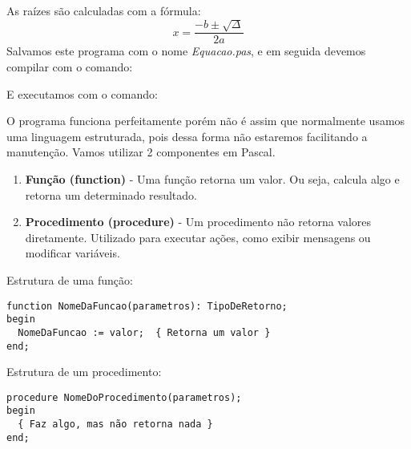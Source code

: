 As raízes são calculadas com a fórmula:
\[
  x = \frac{-b \pm \sqrt{\Delta}}{2a}
\]
Salvamos este programa com o nome \textit{Equacao.pas}, e em seguida devemos compilar com o comando: \\

E executamos com o comando: \\

O programa funciona perfeitamente porém não é assim que normalmente usamos uma linguagem estruturada, pois dessa forma não estaremos facilitando a manutenção. Vamos utilizar 2 componentes em Pascal. \vspace{-2em}
\begin{enumerate}
	\item \textbf{Função (function)} - Uma função retorna um valor. Ou seja, calcula algo e retorna um determinado resultado.
	\item \textbf{Procedimento (procedure)} - Um procedimento não retorna valores diretamente. Utilizado para executar ações, como exibir mensagens ou modificar variáveis.
\end{enumerate}

Estrutura de uma função:
\begin{lstlisting}[]
function NomeDaFuncao(parametros): TipoDeRetorno;
begin
  NomeDaFuncao := valor;  { Retorna um valor }
end;
\end{lstlisting}

Estrutura de um procedimento:
\begin{lstlisting}[]
procedure NomeDoProcedimento(parametros);
begin
  { Faz algo, mas não retorna nada }
end;	
\end{lstlisting}

